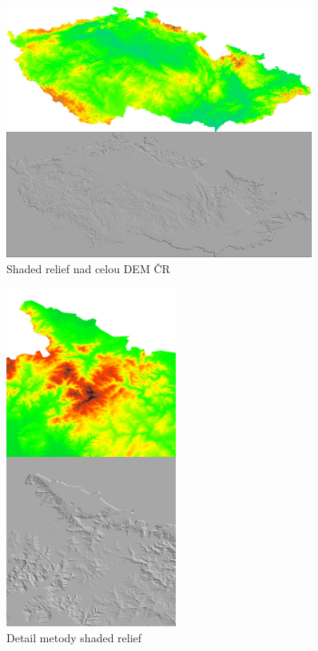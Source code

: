 \documentclass[12pt,a4paper,titlepage,final]{report}
\begin{document}
\begin{figure}[ht]
\begin{center}
\includegraphics[width=0.9\textwidth]{images/sr_cr.jpg}
\caption{Shaded relief nad celou DEM ČR}
\label{fig:slope-cr}
\end{center}
\end{figure}

\begin{figure}[ht]
\begin{center}
\includegraphics[width=0.5\textwidth]{images/sr_detail.jpg}
\caption{Detail metody shaded relief}
\label{fig:slope-det}
\end{center}
\end{figure}
\end{document}
